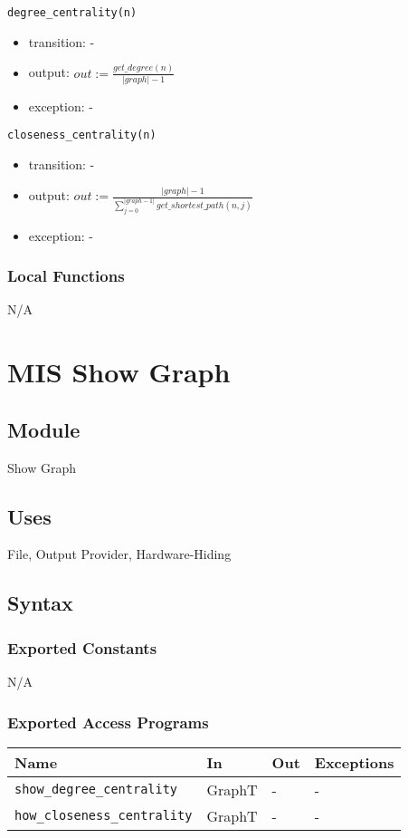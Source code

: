 \documentclass[12pt, titlepage]{article}
\begin{document}
\noindent \texttt{degree\_centrality(n)}
\begin{itemize}
\item transition: -
\item output: $out:=\frac{get\_degree(n)}{|graph| - 1}  $
\item exception: - 
\end{itemize}

\noindent \texttt{closeness\_centrality(n)}
\begin{itemize}
\item transition: -
\item output: $out:= \frac{|graph|- 1}{\sum_{j=0}^{|graph-1|}{get\_shortest\_path(n,j)}} $
\item exception: - 
\end{itemize}

\subsubsection{Local Functions}
N/A
\newpage

\section{MIS Show Graph} \label{Module} 


\subsection{Module}
Show Graph

\subsection{Uses}
File, Output Provider, Hardware-Hiding
\subsection{Syntax}

\subsubsection{Exported Constants}
N/A
\subsubsection{Exported Access Programs}
\begin{center}
\begin{tabular}{|p{6cm}|p{2.5cm}|p{2.5cm}|p{4cm}|}
\hline
\textbf{Name} & \textbf{In} & \textbf{Out} & \textbf{Exceptions} \\
\hline
\texttt{show\_degree\_centrality} & GraphT& - & - \\
\texttt{how\_closeness\_centrality} & GraphT & - & - \\
\hline
\end{tabular}
\end{center}
\end{document}
